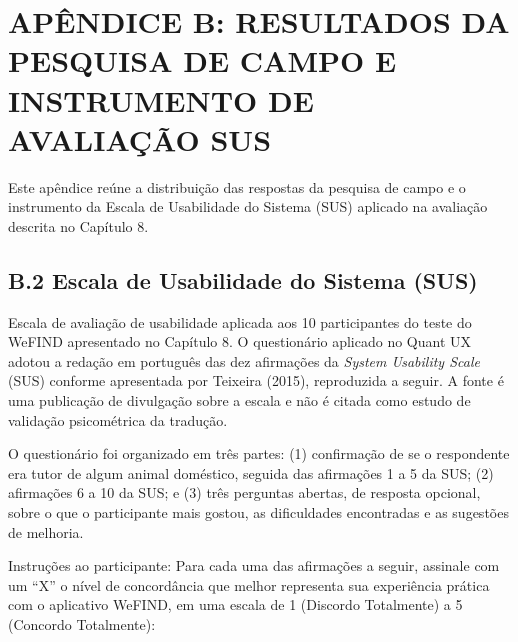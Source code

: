 \section*{APÊNDICE B: RESULTADOS DA PESQUISA DE CAMPO E INSTRUMENTO DE AVALIAÇÃO SUS}
{}

Este apêndice reúne a distribuição das respostas da pesquisa de campo e o instrumento da Escala de Usabilidade do Sistema (SUS) aplicado na avaliação descrita no Capítulo 8.



\subsection*{B.2 Escala de Usabilidade do Sistema (SUS)}

Escala de avaliação de usabilidade aplicada aos 10 participantes do teste do WeFIND apresentado no Capítulo 8. O questionário aplicado no Quant UX adotou a redação em português das dez afirmações da \textit{System Usability Scale} (SUS) conforme apresentada por Teixeira (2015), reproduzida a seguir. A fonte é uma publicação de divulgação sobre a escala e não é citada como estudo de validação psicométrica da tradução.

O questionário foi organizado em três partes: (1) confirmação de se o respondente era tutor de algum animal doméstico, seguida das afirmações 1 a 5 da SUS; (2) afirmações 6 a 10 da SUS; e (3) três perguntas abertas, de resposta opcional, sobre o que o participante mais gostou, as dificuldades encontradas e as sugestões de melhoria.

\vspace{0.3cm}
\noindent
Instruções ao participante: Para cada uma das afirmações a seguir, assinale com um ``X'' o nível de concordância que melhor representa sua experiência prática com o aplicativo WeFIND, em uma escala de 1 (Discordo Totalmente) a 5 (Concordo Totalmente):

